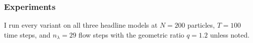 \documentclass{article}
\begin{document}

\subsubsection{Experiments}
\label{sec:edh-experiments}
I run every variant on all three headline models at $N = 200$ particles, $T = 100$ time steps, and $n_\lambda = 29$ flow steps with the geometric ratio $q = 1.2$ unless noted.
\end{document}
